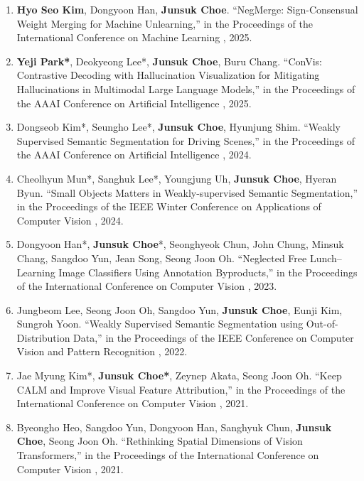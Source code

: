 \documentclass[letterpaper,11pt]{article}
\begin{document}
\begin{enumerate}[itemsep=5.5pt]
    \item \textbf{Hyo Seo Kim}, Dongyoon Han\textdagger, \textbf{Junsuk Choe\textdagger}.
    ``NegMerge: Sign-Consensual Weight Merging for Machine Unlearning,''
    in the Proceedings of the International Conference on Machine Learning , 2025.

    \item \textbf{Yeji Park*}, Deokyeong Lee*, \textbf{Junsuk Choe\textdagger}, Buru Chang\textdagger.
    ``ConVis: Contrastive Decoding with Hallucination Visualization for Mitigating Hallucinations in Multimodal Large Language Models,''
    in the Proceedings of the AAAI Conference on Artificial Intelligence , 2025.

    \item Dongseob Kim*, Seungho Lee*, \textbf{Junsuk Choe}, Hyunjung Shim.
    ``Weakly Supervised Semantic Segmentation for Driving Scenes,''
    in the Proceedings of the AAAI Conference on Artificial Intelligence , 2024.

    \item Cheolhyun Mun*, Sanghuk Lee*, Youngjung Uh, \textbf{Junsuk Choe}, Hyeran Byun.
    ``Small Objects Matters in Weakly-supervised Semantic Segmentation,''
    in the Proceedings of the IEEE Winter Conference on Applications of Computer Vision , 2024.

    \item Dongyoon Han*, \textbf{Junsuk Choe}*, Seonghyeok Chun, John Chung, Minsuk Chang, Sangdoo Yun, Jean Song, Seong Joon Oh.
    ``Neglected Free Lunch--Learning Image Classifiers Using Annotation Byproducts,''
    in the Proceedings of the International Conference on Computer Vision , 2023.

    \item Jungbeom Lee, Seong Joon Oh, Sangdoo Yun, \textbf{Junsuk Choe}, Eunji Kim, Sungroh Yoon.
    ``Weakly Supervised Semantic Segmentation using Out-of-Distribution Data,''
    in the Proceedings of the IEEE Conference on Computer Vision and Pattern Recognition , 2022.

    \item Jae Myung Kim*, \textbf{Junsuk Choe*}, Zeynep Akata, Seong Joon Oh.
    ``Keep CALM and Improve Visual Feature Attribution,''
    in the Proceedings of the International Conference on Computer Vision , 2021.

    \item Byeongho Heo, Sangdoo Yun, Dongyoon Han, Sanghyuk Chun, \textbf{Junsuk Choe}, Seong Joon Oh.
    ``Rethinking Spatial Dimensions of Vision Transformers,''
    in the Proceedings of the International Conference on Computer Vision , 2021.


\end{enumerate}
\end{document}
